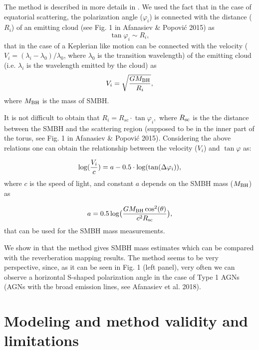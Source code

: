 \documentclass{iau}
\begin{document}
The method is described in more details in \cite{ap15}. We used the fact that in the case
of equatorial scattering, the polarization angle ($\varphi_i$)   is connected with the 
distance ($R_i$) of an emitting cloud (see Fig. 1 in Afanasiev \& Popovi\'c 2015) as 
$$\tan\varphi_i\sim R_i,$$
that in the case of a Keplerian like motion can be connected with the velocity 
($V_i=(\lambda_i-\lambda_0)/\lambda_0$, where $\lambda_0$ is the transition wavelength)
of the emitting
cloud (i.e. $\lambda_i$ is the wavelength emitted by the cloud) as
$$V_i=\sqrt{GM_{\rm BH}\over{R_i}},$$
where  $M_{\rm BH}$ is the mass of SMBH.

It is not difficult to obtain that $R_i= R_{sc}\cdot\tan\varphi_i,$ where $R_{\rm sc}$ is the the 
distance between the SMBH and the scattering region (supposed to be in the inner part of
the torus, see Fig. 1 in Afanasiev \& Popovi\'c 2015). 
Considering the above relations  one can obtain the relationship between the velocity ($V_i$)
 and 
$\tan\varphi$ as:

$$\log({V_i\over c})=a-0.5\cdot \log(\tan(\Delta\varphi_i)),$$
where $c$ is the speed of light, and constant $a$   depends on the SMBH 
mass ($M_{\rm BH}$) as

$$a=0.5\log\bigl({{GM_{\rm BH} \cos^2(\theta)}\over{c^2R_{\rm sc}}}\bigr),$$
that can be used for the SMBH mass measurements. 

We show in \cite{ap15} that 
the method gives SMBH mass estimates which can be compared with the reverberation mapping results.
The method seems to be very perspective, since, 
as it can be seen in Fig. 1 (left panel),  very often we can observe  a horizontal 
S-shaped polarization angle  in the case of Type 1 AGNs (AGNs with the 
broad emission lines, see  Afanasiev et al. 2018).

\section{Modeling and method validity and limitations}
\end{document}
